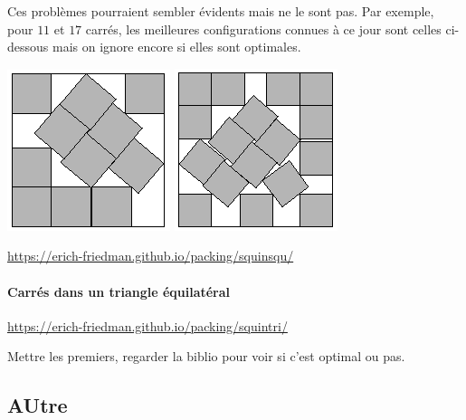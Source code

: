 \begin{exo}
\begin{center}
\end{center}
Ces problèmes pourraient sembler évidents mais ne le sont pas. Par exemple, pour $11$ et $17$ carrés, les meilleures configurations connues à ce jour sont celles ci-dessous mais on ignore encore si elles sont optimales.
\begin{center}
\includegraphics[scale=.5]{sqinsq/s11.png}
\includegraphics[scale=.5]{sqinsq/s17.png}
\end{center}
\begin{hint}
\end{hint}
\begin{sol}
\url{https://erich-friedman.github.io/packing/squinsqu/}
\end{sol}
\end{exo}


\paragraph{Carrés dans un triangle équilatéral }

\url{https://erich-friedman.github.io/packing/squintri/}

Mettre les premiers, regarder la biblio pour voir si c'est optimal ou pas.

\subsection{AUtre}








